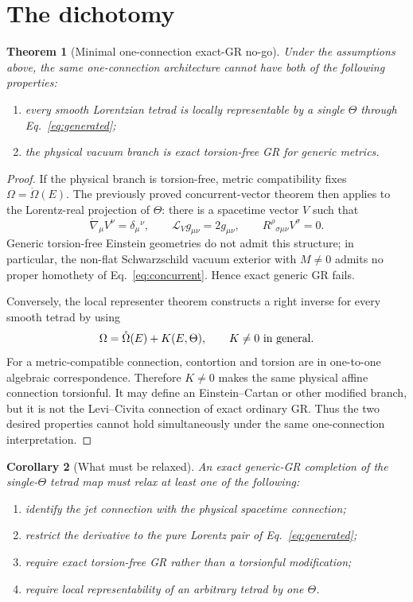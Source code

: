 \documentclass[11pt,a4paper]{article}
\newtheorem{theorem}{Theorem}
\newtheorem{corollary}[theorem]{Corollary}
\begin{document}
\section{The dichotomy}
\begin{theorem}[Minimal one-connection exact-GR no-go]
\label{thm:main}
Under the assumptions above, the same one-connection architecture cannot have
both of the following properties:
\begin{enumerate}
 \item every smooth Lorentzian tetrad is locally representable by a single
 $\Theta$ through Eq.~\eqref{eq:generated};
 \item the physical vacuum branch is exact torsion-free GR for generic metrics.
\end{enumerate}
\end{theorem}

\begin{proof}
If the physical branch is torsion-free, metric compatibility fixes
$\Omega=\mathring\Omega(E)$.  The previously proved concurrent-vector theorem
then applies to the Lorentz-real projection of $\Theta$: there is a spacetime
vector $V$ such that
\begin{equation}
 \mathring\nabla_\mu V^\nu=\delta_\mu{}^\nu,
 \qquad
 \mathcal L_V g_{\mu\nu}=2g_{\mu\nu},
 \qquad
 R^\rho{}_{\sigma\mu\nu}V^\sigma=0.
 \label{eq:concurrent}
\end{equation}
Generic torsion-free Einstein geometries do not admit this structure; in
particular, the non-flat Schwarzschild vacuum exterior with $M\ne0$ admits no
proper homothety of Eq.~\eqref{eq:concurrent}.  Hence exact generic GR fails.

Conversely, the local representer theorem constructs a right inverse for every
smooth tetrad by using
\begin{equation}
 \Omega=\mathring\Omega(E)+K(E,\Theta),
 \qquad K\ne0\ \hbox{in general}.
\end{equation}
For a metric-compatible connection, contortion and torsion are in one-to-one
algebraic correspondence.  Therefore $K\ne0$ makes the same physical affine
connection torsionful.  It may define an Einstein--Cartan or other modified
branch, but it is not the Levi--Civita connection of exact ordinary GR.
Thus the two desired properties cannot hold simultaneously under the same
one-connection interpretation.
\end{proof}

\begin{corollary}[What must be relaxed]
An exact generic-GR completion of the single-$\Theta$ tetrad map must relax at
least one of the following:
\begin{enumerate}
 \item identify the jet connection with the physical spacetime connection;
 \item restrict the derivative to the pure Lorentz pair of
 Eq.~\eqref{eq:generated};
 \item require exact torsion-free GR rather than a torsionful modification;
 \item require local representability of an arbitrary tetrad by one $\Theta$.
\end{enumerate}
\end{corollary}
\end{document}
